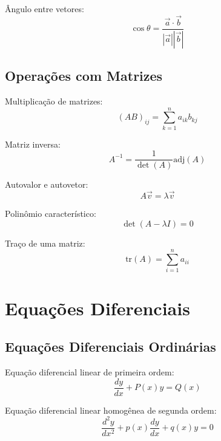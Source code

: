 Ângulo entre vetores:
\begin{equation}
\cos\theta = \frac{\vec{a} \cdot \vec{b}}{|\vec{a}||\vec{b}|}
\end{equation}

\subsection{Operações com Matrizes}

Multiplicação de matrizes:
\begin{equation}
(AB)_{ij} = \sum_{k=1}^{n} a_{ik}b_{kj}
\end{equation}

Matriz inversa:
\begin{equation}
A^{-1} = \frac{1}{\det(A)} \text{adj}(A)
\end{equation}

Autovalor e autovetor:
\begin{equation}
A\vec{v} = \lambda\vec{v}
\end{equation}

Polinômio característico:
\begin{equation}
\det(A - \lambda I) = 0
\end{equation}

Traço de uma matriz:
\begin{equation}
\text{tr}(A) = \sum_{i=1}^{n} a_{ii}
\end{equation}


\section{Equações Diferenciais}

\subsection{Equações Diferenciais Ordinárias}

Equação diferencial linear de primeira ordem:
\begin{equation}
\frac{dy}{dx} + P(x)y = Q(x)
\end{equation}

Equação diferencial linear homogênea de segunda ordem:
\begin{equation}
\frac{d^2y}{dx^2} + p(x)\frac{dy}{dx} + q(x)y = 0
\end{equation}

